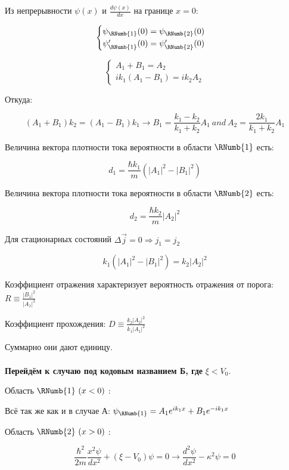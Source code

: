 	Из непрерывности $\psi(x)$ и $\frac{d\psi(x)}{dx}$ на границе $x = 0$:
	
	\begin{equation*}
	\begin{cases}
		\psi_{\RNumb{1}} (0) = \psi_{\RNumb{2}} (0) \\
		\psi'_{\RNumb{1}} (0) = \psi'_{\RNumb{2}} (0)
	\end{cases}
	\end{equation*}
	
	\begin{equation*}
	\begin{cases}
	 A_1 + B_1 = A_2 \\
	 ik_1 (A_1 - B_1) = i k_2 A_2
	\end{cases}
	\end{equation*}
	
	Откуда:
	
	$$(A_1 +B_1)k_2 = (A_1 - B_1)k_1 \rightarrow B_1 = \frac{k_1 - k_2}{k_1 + k_2} A_1 \ and \ A_2 = \frac{2 k_1}{k_1 +k_2} A_1$$
		
	Величина вектора плотности тока вероятности в области $\RNumb{1}$ есть:
	
	$$d_1 = \frac{\hbar k_1}{m} (| A_1 |^2 - | B_1 |^2)$$
	
	Величина вектора плотности тока вероятности в области $\RNumb{2}$ есть:
	
	$$d_2 = \frac{\hbar k_2}{m} | A_2 |^2$$
	
	Для стационарных состояний $\Delta \vec{j} = 0 \Rightarrow j_1 = j_2$
	
	$$k_1(|A_1|^2 - |B_1|^2) = k_2 |A_2|^2$$
	
	Коэффициент отражения характеризует вероятность отражения от порога: $R \equiv \frac{| B_1 |^2}{| A_1 |^2}$
	
	Коэффициент прохождения: $D \equiv \frac{k_2 | A_2 |^2 }{k_1 | A_1 |^2}$
	
	Суммарно они дают единицу.
	\\\\
	\textbf{Перейдём к случаю под кодовым названием Б, где} $\xi < V_0$.
	
	Область $\RNumb{1} \ (x<0)$ :
	 
	Всё так же как и в случае А: $\psi_{\RNumb{1}} = A_1 e^{i k_1 x} + B_1 e^{-i k_1 x}$
	
	Область $\RNumb{2} \ (x>0)$ :
	
	$$\frac{\hbar^2}{2m} \frac{x^2 \psi}{dx^2} + (\xi -V_0) \psi = 0 \rightarrow \frac{d^2 \psi}{dx^2} - \kappa^2 \psi = 0$$
	
